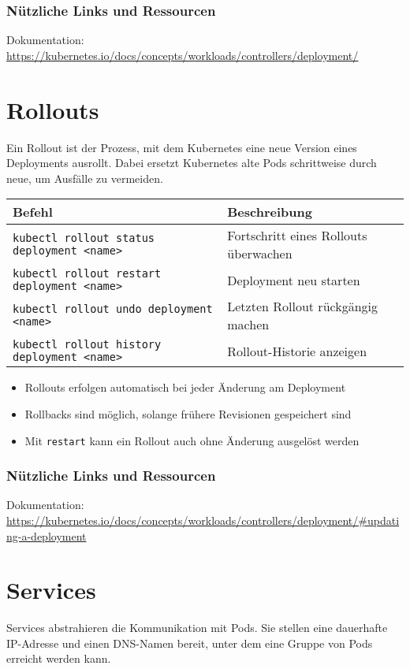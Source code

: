 \subsubsection{Nützliche Links und Ressourcen}
Dokumentation: \url{https://kubernetes.io/docs/concepts/workloads/controllers/deployment/}
\newpage

\section{Rollouts}
Ein Rollout ist der Prozess, mit dem Kubernetes eine neue Version eines Deployments ausrollt. Dabei ersetzt Kubernetes alte Pods schrittweise durch neue, um Ausfälle zu vermeiden. \\

\noindent
\begin{tabular}{|p{}|p{}|}
\hline
\textbf{Befehl} & \textbf{Beschreibung} \\
\hline
\texttt{kubectl rollout status deployment <name>} & Fortschritt eines Rollouts überwachen \\
\texttt{kubectl rollout restart deployment <name>} & Deployment neu starten\\
\texttt{kubectl rollout undo deployment <name>} & Letzten Rollout rückgängig machen \\
\texttt{kubectl rollout history deployment <name>} & Rollout-Historie anzeigen \\
\hline
\end{tabular}

\begin{itemize}
    \item Rollouts erfolgen automatisch bei jeder Änderung am Deployment
    \item Rollbacks sind möglich, solange frühere Revisionen gespeichert sind
    \item Mit \texttt{restart} kann ein Rollout auch ohne Änderung ausgelöst werden
\end{itemize}
\subsubsection{Nützliche Links und Ressourcen}
Dokumentation:\\
\url{https://kubernetes.io/docs/concepts/workloads/controllers/deployment/#updating-a-deployment}




\section{Services}
\label{sec:services}
Services abstrahieren die Kommunikation mit Pods. Sie stellen eine dauerhafte IP-Adresse und einen DNS-Namen bereit, unter dem eine Gruppe von Pods erreicht werden kann. \\

